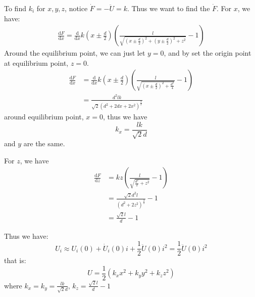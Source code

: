 \documentclass{article}
\newcommand{\de}{\mathrm{d}}
\begin{document}
\begin{enumerate}
        To find $k_i$ for $x, y, z$, notice $\dot{F} = -\ddot{U} = k$. Thus we want to find the $\dot{F}$.
        For $x$, we have:
        \begin{align*}
            \frac{\de F}{\de x} = \frac{\de}{\de x}k(x\pm \frac{d}{2}) (\frac{l}{\sqrt{(x\pm \frac{d}{2})^2 + (y\pm \frac{d}{2})^2 + z^2}} -1)
        \end{align*}
        Around the equilibrium point, we can just let $y = 0$, and by set the origin point at equilibrium point, $z = 0$.
        \begin{align*}
            \frac{\de F}{\de x} &= \frac{\de}{\de x}k(x\pm \frac{d}{2}) (\frac{l}{\sqrt{(x\pm \frac{d}{2})^2 + \frac{d^2}{4}}} -1)\\
            &= \frac{d^2l k}{\sqrt{2}(d^2+2dx+2x^2)^\frac{3}{2}}
        \end{align*}
        around equilibrium point, $x = 0$, thus we have
        \[
        k_x = \frac{l k}{\sqrt{2}d}
        \]
        and $y$ are the same.

        For $z$, we have
        \begin{align*}
            \frac{\de F}{\de z} &= kz (\frac{l}{\sqrt{\frac{d^2}{2} + z^2}}-1)\\
            &= \frac{\sqrt{2}d^2l}{(d^2+2z^2)^\frac{3}{2}} - 1\\
            &= \frac{\sqrt{2}l}{d} - 1
        \end{align*}


        Thus we have:
        \[
        U_i \approx U_i(0) + \dot{U}_i(0)i + \frac{1}{2}\ddot{U}(0)i^2 = \frac{1}{2}\ddot{U}(0)i^2
        \]
        that is:
        \[
        U = \frac{1}{2} (k_xx^2+k_yy^2+k_zz^2)
        \]
        where $k_x = k_y = \frac{l k}{\sqrt{2}d}$, $k_z = \frac{\sqrt{2}l}{d} - 1$



\end{enumerate}
\end{document}

